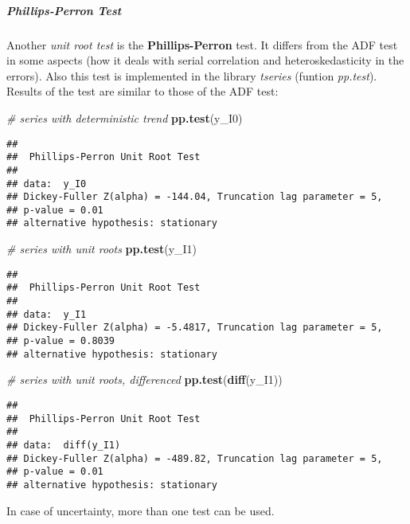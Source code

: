 \documentclass[
]{article}
\newenvironment{Shaded}{\begin{snugshade}}{\end{snugshade}}
\newcommand{\CommentTok}[1]{\textcolor[rgb]{0.56,0.35,0.01}{\textit{#1}}}
\newcommand{\FunctionTok}[1]{\textcolor[rgb]{0.13,0.29,0.53}{\textbf{#1}}}
\newcommand{\NormalTok}[1]{#1}
\begin{document}
\subparagraph{Phillips-Perron Test}\label{phillips-perron-test}

Another \emph{unit root test} is the \textbf{Phillips-Perron} test. It differs from the ADF test in some aspects (how it deals with serial correlation and heteroskedasticity in the errors). Also this test is implemented in the library \emph{tseries} (funtion \emph{pp.test}). Results of the test are similar to those of the ADF test:

\begin{Shaded}
\begin{Highlighting}[]
\CommentTok{\# series with deterministic trend}
\FunctionTok{pp.test}\NormalTok{(y\_I0)}
\end{Highlighting}
\end{Shaded}

\begin{verbatim}
## 
##  Phillips-Perron Unit Root Test
## 
## data:  y_I0
## Dickey-Fuller Z(alpha) = -144.04, Truncation lag parameter = 5,
## p-value = 0.01
## alternative hypothesis: stationary
\end{verbatim}

\begin{Shaded}
\begin{Highlighting}[]
\CommentTok{\# series with unit roots}
\FunctionTok{pp.test}\NormalTok{(y\_I1)}
\end{Highlighting}
\end{Shaded}

\begin{verbatim}
## 
##  Phillips-Perron Unit Root Test
## 
## data:  y_I1
## Dickey-Fuller Z(alpha) = -5.4817, Truncation lag parameter = 5,
## p-value = 0.8039
## alternative hypothesis: stationary
\end{verbatim}

\begin{Shaded}
\begin{Highlighting}[]
\CommentTok{\# series with unit roots, differenced}
\FunctionTok{pp.test}\NormalTok{(}\FunctionTok{diff}\NormalTok{(y\_I1))}
\end{Highlighting}
\end{Shaded}

\begin{verbatim}
## 
##  Phillips-Perron Unit Root Test
## 
## data:  diff(y_I1)
## Dickey-Fuller Z(alpha) = -489.82, Truncation lag parameter = 5,
## p-value = 0.01
## alternative hypothesis: stationary
\end{verbatim}

In case of uncertainty, more than one test can be used.
\end{document}
